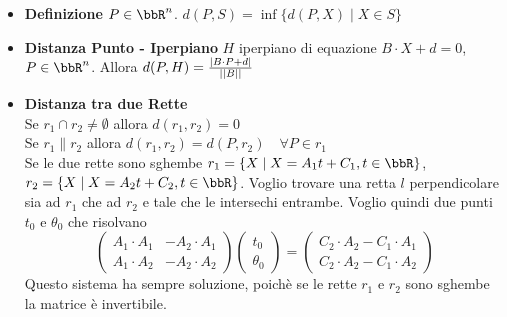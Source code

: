\documentclass[a4paper,NoNotes,GeneralMath]{stdmdoc}
\begin{document}
	\begin{itemize}
		\item {\bf Definizione} $P \in \bbR^n$. $d(P, S) = \inf \{d(P,X) \mid X \in S \}$
		\item {\bf Distanza Punto - Iperpiano} $H$ iperpiano di equazione $B \cdot X + d = 0$, $P \in \bbR^n$. Allora $d(P, H) = \frac{\mid B \cdot P + d \mid}{\mid\mid B \mid\mid}$
		\item {\bf Distanza tra due Rette} \\ Se $r_1 \cap r_2 \neq \emptyset$ allora $d(r_1, r_2) = 0$ \\ Se $r_1 \parallel r_2$ allora $d(r_1, r_2) = d(P, r_2) \quad \forall P \in r_1$ \\ Se le due rette sono sghembe $r_1 = \{X \mid X = A_1t+C_1, t \in \bbR\}$, $r_2 = \{X \mid X = A_2t+C_2, t \in \bbR\}$. Voglio trovare una retta $l$ perpendicolare sia ad $r_1$ che ad $r_2$ e tale che le intersechi entrambe. Voglio quindi due punti $t_0$ e $\theta_0$ che risolvano $$\left( \begin{array}{cc} A_1\cdot A_1 & -A_2\cdot A_1 \\ A_1\cdot A_2 & -A_2\cdot A_2 \end{array} \right)\left(\begin{array}{c} t_0 \\ \theta_0 \end{array}\right) = \left( \begin{array}{c} C_2\cdot A_2 -C_1\cdot A_1 \\ C_2 \cdot A_2 - C_1 \cdot A_2 \end{array}\right)$$ Questo sistema ha sempre soluzione, poichè se le rette $r_1$ e $r_2$ sono sghembe la matrice è invertibile.
	\end{itemize}

\end{document}
